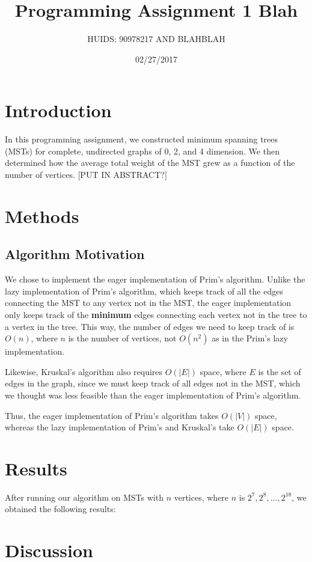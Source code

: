\documentclass[a4paper]{article}
\title{Programming Assignment 1 Blah}
\author{HUIDS: 90978217 AND BLAHBLAH}
\date{02/27/2017}
\begin{document}
\maketitle

\section{Introduction}
In this programming assignment, we constructed minimum spanning trees (MSTs) for complete, undirected graphs of 0, 2, and 4 dimension. We then determined how the average total weight of the MST grew as a function of the number of vertices. [PUT IN ABSTRACT?]


\section{Methods}
\subsection{Algorithm Motivation}
We chose to implement the eager implementation of Prim's algorithm. Unlike the lazy implementation of Prim's algorithm, which keeps track of all the edges connecting the MST to any vertex not in the MST, the eager implementation only keeps track of the \textbf{minimum} edges connecting each vertex not in the tree to a vertex in the tree. This way, the number of edges we need to keep track of is $O(n)$, where $n$ is the number of vertices, not $O(n^2)$ as in the Prim's lazy implementation.

Likewise, Kruskal's algorithm also requires $O(|E|)$ space, where $E$ is the set of edges in the graph, since we must keep track of all edges not in the MST, which we thought was less feasible than the eager implementation of Prim's algorithm.

Thus, the eager implementation of Prim's algorithm takes $O(|V|)$ space, whereas the lazy implementation of Prim's and Kruskal's take $O(|E|)$ space. 

\section{Results}
After running our algorithm on MSTs with $n$ vertices, where $n$ is $2^7, 2^8, ..., 2^18$, we obtained the following results:


\section{Discussion}
\end{document}
